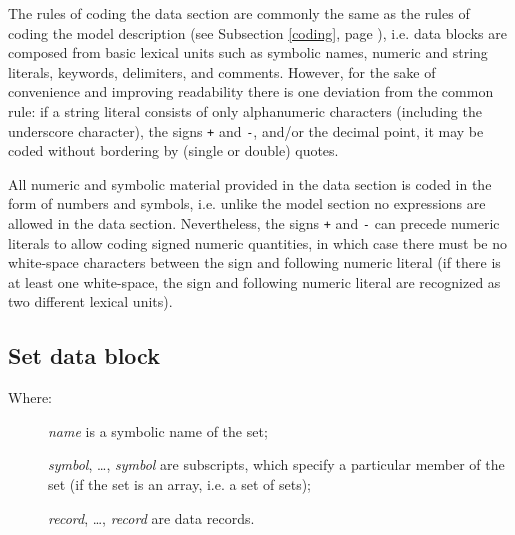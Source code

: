 \documentclass[10pt]{article}
\begin{document}
The rules of coding the data section are commonly the same as the rules
of coding the model description (see Subsection \ref{coding}, page
\pageref{coding}), i.e. data blocks are composed from basic lexical
units such as symbolic names, numeric and string literals, keywords,
delimiters, and comments. However, for the sake of convenience and
improving readability there is one deviation from the common rule: if
a string literal consists of only alphanumeric characters (including
the underscore character), the signs {\tt+} and {\tt-}, and/or the
decimal point, it may be coded without bordering by (single or double)
quotes.

All numeric and symbolic material provided in the data section is coded
in the form of numbers and symbols, i.e. unlike the model section
no expressions are allowed in the data section. Nevertheless, the signs
{\tt+} and {\tt-} can precede numeric literals to allow coding signed
numeric quantities, in which case there must be no white-space
characters between the sign and following numeric literal (if there is
at least one white-space, the sign and following numeric literal are
recognized as two different lexical units).

\subsection{Set data block}

\medskip


\setlength{\leftmargini}{60pt}

\begin{description}
\item[{\rm Where:}\hspace*{23pt}] {\it name} is a symbolic name of the
set;
\item[\hspace*{54pt}] {\it symbol}, \dots, {\it symbol} are subscripts,
which specify a particular member of the set (if the set is an array,
i.e. a set of sets);
\item[\hspace*{54pt}] {\it record}, \dots, {\it record} are data
records.
\end{description}
\end{document}
